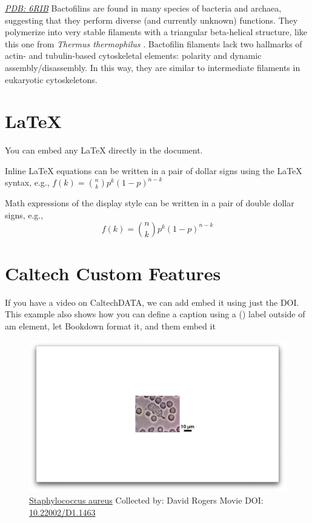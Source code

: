 \documentclass[]{tufte-book}
\begin{document}
\href{http://rcsb.org/structure/6RIB}{\emph{PDB: 6RIB}} Bactofilins are
found in many species of bacteria and archaea, suggesting that they
perform diverse (and currently unknown) functions. They polymerize into
very stable filaments with a triangular beta-helical structure, like
this one from \emph{Thermus thermophilus} \citep{deng2019}. Bactofilin
filaments lack two hallmarks of actin- and tubulin-based cytoskeletal
elements: polarity and dynamic assembly/disassembly. In this way, they
are similar to intermediate filaments in eukaryotic cytoskeletons.

\section{LaTeX}\label{latex}

You can embed any LaTeX directly in the document.

Inline LaTeX equations can be written in a pair of dollar signs using
the LaTeX syntax, e.g., \(f(k) = {n \choose k} p^{k} (1-p)^{n-k}\)

Math expressions of the display style can be written in a pair of double
dollar signs, e.g., \[f(k) = {n \choose k} p^{k} (1-p)^{n-k}\]

\section{Caltech Custom Features}\label{caltech-custom-features}

If you have a video on CaltechDATA, we can add embed it using just the
DOI. This example also shows how you can define a caption using a ()
label outside of am element, let Bookdown format it, and them embed it





\begin{figure}
\includegraphics{movie_stills/1_1} \caption[\protect\hyperlink{methods}{Staphylococcus aureus} Collected
by: David Rogers Movie DOI:
\href{https://doi.org/10.22002/D1.1463}{10.22002/D1.1463}]{\protect\hyperlink{methods}{Staphylococcus aureus} Collected
by: David Rogers Movie DOI:
\href{https://doi.org/10.22002/D1.1463}{10.22002/D1.1463}}\label{fig:1-1}
\end{figure}
\end{document}
